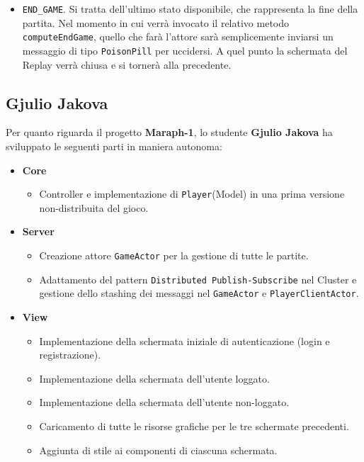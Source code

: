 \begin{itemize}
\begin {itemize}
     \item \texttt{END\_GAME}. Si tratta dell'ultimo stato disponibile, che rappresenta la fine della partita. Nel momento in cui verrà invocato il relativo metodo \texttt{computeEndGame}, quello che farà l'attore sarà semplicemente inviarsi un messaggio di tipo \texttt{PoisonPill} per uccidersi. A quel punto la schermata del Replay verrà chiusa e si tornerà alla precedente.
     
     
          \end{itemize}
     
    
     \end{itemize}
     
     
     
     
     \clearpage
        \subsection{Gjulio Jakova}\label{subsec:jakova}

 Per quanto riguarda il progetto \textbf{Maraph-1}, lo studente \textbf{Gjulio Jakova} ha sviluppato le seguenti parti in maniera autonoma:
        
        \begin{itemize}
        \item \textbf{Core}
        		\begin {itemize} 
		\item 	Controller e implementazione di \texttt{Player}(Model) in una prima versione non-distribuita del gioco.
     	\end {itemize}
     
     	\item \textbf{Server}
		\begin {itemize}
		\item Creazione attore \texttt{GameActor} per la gestione di tutte le partite.
		\item Adattamento del pattern \texttt{Distributed Publish-Subscribe} nel Cluster e gestione dello stashing dei messaggi nel \texttt{GameActor} e \texttt{PlayerClientActor}.
	\end {itemize}
	
	\item \textbf{View}
		\begin {itemize}
		\item Implementazione della schermata iniziale di autenticazione (login e registrazione).
		\item Implementazione della schermata dell’utente loggato.
		\item Implementazione della schermata dell’utente non-loggato.
		\item Caricamento di tutte le risorse grafiche per le tre schermate precedenti.
		\item Aggiunta di stile ai componenti di ciascuna schermata.
		\end{itemize}
		
     \end {itemize}

